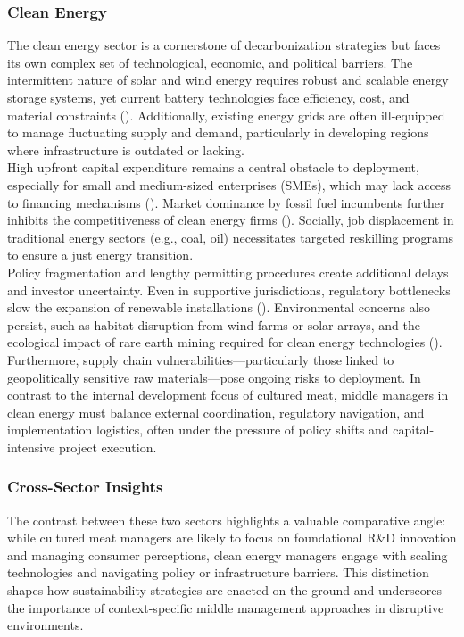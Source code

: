 	\subsubsection{Clean Energy}
	The clean energy sector is a cornerstone of decarbonization strategies but faces its own complex set of technological, economic, and political barriers. The intermittent nature of solar and wind energy requires robust and scalable energy storage systems, yet current battery technologies face efficiency, cost, and material constraints (\textcite{Zhang2016, IEA2021}). Additionally, existing energy grids are often ill-equipped to manage fluctuating supply and demand, particularly in developing regions where infrastructure is outdated or lacking. \\
	
	High upfront capital expenditure remains a central obstacle to deployment, especially for small and medium-sized enterprises (SMEs), which may lack access to financing mechanisms (\textcite{Mngumi2022}). Market dominance by fossil fuel incumbents further inhibits the competitiveness of clean energy firms (\textcite{IRENA2017}). Socially, job displacement in traditional energy sectors (e.g., coal, oil) necessitates targeted reskilling programs to ensure a just energy transition. \\
	
	Policy fragmentation and lengthy permitting procedures create additional delays and investor uncertainty. Even in supportive jurisdictions, regulatory bottlenecks slow the expansion of renewable installations (\textcite{Zhang2016}). Environmental concerns also persist, such as habitat disruption from wind farms or solar arrays, and the ecological impact of rare earth mining required for clean energy technologies (\textcite{IEA2021}). Furthermore, supply chain vulnerabilities—particularly those linked to geopolitically sensitive raw materials—pose ongoing risks to deployment. In contrast to the internal development focus of cultured meat, middle managers in clean energy must balance external coordination, regulatory navigation, and implementation logistics, often under the pressure of policy shifts and capital-intensive project execution. \\
	
	\subsubsection{Cross-Sector Insights}
	The contrast between these two sectors highlights a valuable comparative angle: while cultured meat managers are likely to focus on foundational R\&D innovation and managing consumer perceptions, clean energy managers engage with scaling technologies and navigating policy or infrastructure barriers. This distinction shapes how sustainability strategies are enacted on the ground and underscores the importance of context-specific middle management approaches in disruptive environments. \\
	
